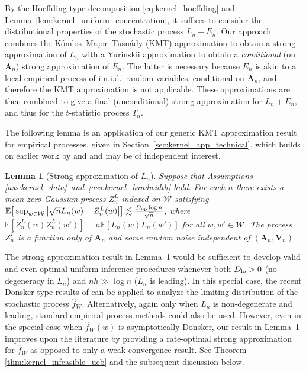 \documentclass[11pt,lof]{puthesis}
\newcommand{\E}{\ensuremath{\mathbb{E}}}
\newcommand{\bA}{\ensuremath{\mathbf{A}}}
\newcommand{\bV}{\ensuremath{\mathbf{V}}}
\newcommand{\cW}{\ensuremath{\mathcal{W}}}
\newcommand{\Dl}{\ensuremath{D_{\textup{lo}}}}
\newcommand{\Du}{\ensuremath{D_{\textup{up}}}}
\theoremstyle{break}
\newtheorem{lemma}{Lemma}[section]
\theoremstyle{proof}
\begin{document}
By the Hoeffding-type decomposition \eqref{eq:kernel_hoeffding} and
Lemma~\ref{lem:kernel_uniform_concentration}, it suffices to consider the
distributional properties of the stochastic process $L_n + E_n$.
Our approach combines the K{\'o}mlos--Major--Tusn{\'a}dy (KMT) approximation
\citep{komlos1975approximation} to obtain a strong approximation of $L_n$ with
a Yurinskii approximation \citep{yurinskii1978error} to obtain a
\emph{conditional} (on $\bA_n$) strong approximation of $E_n$. The latter is
necessary because $E_n$ is akin to a local empirical process of i.n.i.d.\
random variables, conditional on $\bA_n$, and therefore the KMT approximation
is not applicable. These approximations are then combined to give a final
(unconditional) strong approximation for $L_n+E_n$, and thus for the
$t$-statistic process $T_n$.

The following lemma is an application of our generic KMT approximation result
for empirical processes, given in Section~\ref{sec:kernel_app_technical}, which
builds on earlier work by \citet{gine2004kernel} and \citet{gine2010confidence}
and may be of independent interest.

\begin{lemma}[Strong approximation of $L_n$]
\label{lem:kernel_strong_approx_Ln}
%
Suppose that Assumptions \ref{ass:kernel_data}~and~\ref{ass:kernel_bandwidth}
hold. For each $n$ there exists a mean-zero Gaussian process $Z^L_n$ indexed
on $\cW$ satisfying
$\E\big[ \sup_{w \in \cW} \big| \sqrt{n} L_n(w) - Z_n^L(w) \big| \big]
\lesssim \frac{\Du \log n}{\sqrt{n}}$, where
$\E[Z_n^L(w)Z_n^L(w')] = n\E[L_n(w)L_n(w')]$ for all $w, w' \in \cW$. The
process $Z_n^L$ is a function only of $\bA_n$ and some random noise
independent of $(\bA_n, \bV_n)$.
\end{lemma}

The strong approximation result in Lemma~\ref{lem:kernel_strong_approx_Ln}
would be
sufficient to develop valid and even optimal uniform inference procedures
whenever both $\Dl > 0$ (no degeneracy in $L_n$) and $n h \gg \log n$
($L_n$ is leading). In this special case, the recent Donsker-type results of
\citet{davezies2021exchangeable} can be applied to analyze the limiting
distribution of the stochastic process $\hat{f}_W$. Alternatively, again only
when $L_n$ is non-degenerate and leading, standard empirical process methods
could also be used. However, even in the special case when $\hat{f}_W(w)$ is
asymptotically Donsker, our result in Lemma~\ref{lem:kernel_strong_approx_Ln}
improves
upon the literature by providing a rate-optimal strong approximation for
$\hat{f}_W$ as opposed to only a weak convergence result. See Theorem
\ref{thm:kernel_infeasible_ucb} and the subsequent discussion below.
\end{document}
